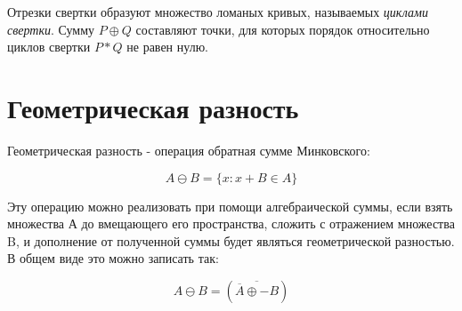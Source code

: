 Отрезки свертки образуют множество ломаных кривых,
называемых \textit{циклами свертки}. Сумму $P \oplus Q$ составляют точки,
для которых порядок относительно циклов свертки $P * Q$ не равен нулю.


\section{Геометрическая разность}

Геометрическая разность - операция обратная сумме Минковского:

\begin{equation}
    A \ominus B = \{x: x + B \in A \}
\end{equation}

Эту операцию можно реализовать при помощи алгебраической суммы,
если взять множества А до вмещающего его пространства,
сложить с отражением множества B, 
и дополнение от полученной суммы
будет являться геометрической разностью.
В общем виде это можно записать так:

\begin{equation}
    A \ominus B = (\overline{\overline{A} \oplus - B})
\end{equation}
